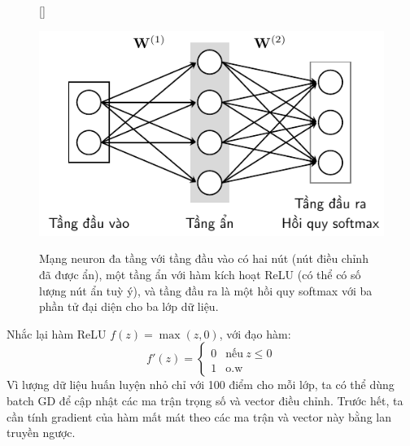 
\begin{figure}[t]
    [\FBwidth]
    {\caption{ 
    Mạng neuron đa tầng với tầng đầu vào có hai nút (nút điều chỉnh đã được ẩn),
    một tầng ẩn với hàm kích hoạt ReLU (có thể có số lượng nút ẩn
    tuỳ ý), và tầng đầu ra là một hồi quy softmax với ba phần tử đại diện
    cho ba lớp dữ liệu. 
    }
    \label{fig:14_8}}
    { %
    \includegraphics[width=.5\textwidth]{Chapters/05_NeuralNetworks/14_mlp/latex/ex_nn.pdf}
    }
\end{figure}
Nhắc lại hàm ReLU $f(z) = \max(z, 0)$, với đạo hàm:
\begin{equation}
    f'(z) = \left\{ 
    \begin{matrix}
        0 & \text{nếu}~ z \leq 0 \\ 
        1 & \text{o.w}
    \end{matrix}
    \right. 
\end{equation}
Vì lượng dữ liệu huấn luyện nhỏ chỉ với 100 điểm cho mỗi lớp, ta có thể dùng
batch GD để cập nhật các ma trận trọng số và vector điều chỉnh. Trước hết, ta cần tính
gradient của hàm mất mát theo các ma trận và vector này bằng lan truyền ngược.

 
